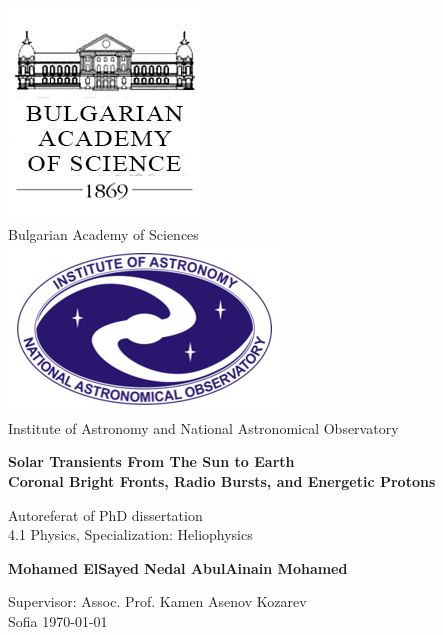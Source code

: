 \begin{titlepage}
    \begin{center}
        \vspace*{0.5cm}
        \centering
        \includegraphics[scale=0.7]{extras/bas_bg_logo.jpg}\\
        
        \LARGE
        Bulgarian Academy of Sciences\\
        
        \includegraphics[scale=0.5]{extras/ianao_logo.png}\\
        
        \LARGE
        Institute of Astronomy and National Astronomical Observatory\\
        
        \vspace{1cm}
        
        \huge
        \textbf{Solar Transients From The Sun to Earth\\}
        \huge
        \textbf{Coronal Bright Fronts, Radio Bursts, and Energetic Protons}
        
        \vspace{1cm}
        
        Autoreferat of PhD dissertation\\
        4.1 Physics, Specialization: Heliophysics
        
        \vspace{1.5cm}
        
        \LARGE
        \textbf{Mohamed ElSayed Nedal AbulAinain Mohamed}
        
        \vfill
        
        
        \vspace{0.5cm}
        
        \Large
        Supervisor: Assoc. Prof. Kamen Asenov Kozarev\\
        Sofia
        \today
        
        \vspace{0.8cm}
        
        
        
    \end{center}
\end{titlepage}
